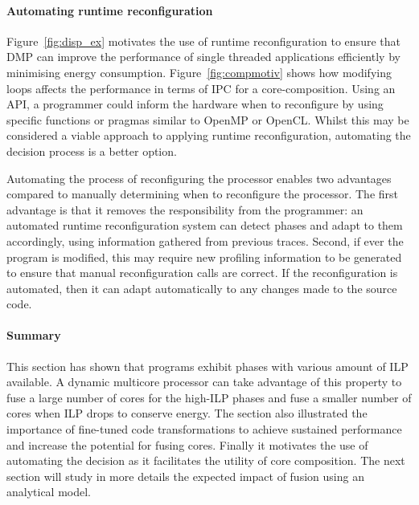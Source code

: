 \paragraph{Automating runtime reconfiguration}

Figure~\ref{fig:disp_ex} motivates the use of runtime reconfiguration to ensure that DMP can improve the performance of single threaded applications efficiently by minimising energy consumption.
Figure~\ref{fig:compmotiv} shows how modifying loops affects the performance in terms of IPC for a core-composition.
Using an API, a programmer could inform the hardware when to reconfigure by using specific functions or pragmas similar to OpenMP or OpenCL.
Whilst this may be considered a viable approach to applying runtime reconfiguration, automating the decision process is a better option.

Automating the process of reconfiguring the processor enables two advantages compared to manually determining when to reconfigure the processor.
The first advantage is that it removes the responsibility from the programmer: an automated runtime reconfiguration system can detect phases and adapt to them accordingly, using information gathered from previous traces.
Second, if ever the program is modified, this may require new profiling information to be generated to ensure that manual reconfiguration calls are correct.
If the reconfiguration is automated, then it can adapt automatically to any changes made to the source code.

\paragraph{Summary}
This section has shown that programs exhibit phases with various amount of ILP available.
A dynamic multicore processor can take advantage of this property to fuse a large number of cores for the high-ILP phases and fuse a smaller number of cores when ILP drops to conserve energy.
The section also illustrated the importance of fine-tuned code transformations to achieve sustained performance and increase the potential for fusing cores.
Finally it motivates the use of automating the decision as it facilitates the utility of core composition.
The next section will study in more details the expected impact of fusion using an analytical model.

